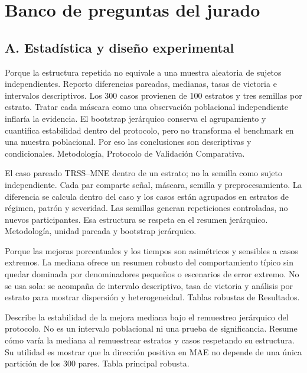 \section*{Banco de preguntas del jurado}

\subsection*{A. Estadística y diseño experimental}

{Porque la estructura repetida no equivale a una muestra aleatoria de sujetos independientes. Reporto diferencias pareadas, medianas, tasas de victoria e intervalos descriptivos.}
{Los 300 casos provienen de 100 estratos y tres semillas por estrato. Tratar cada máscara como una observación poblacional independiente inflaría la evidencia. El bootstrap jerárquico conserva el agrupamiento y cuantifica estabilidad dentro del protocolo, pero no transforma el benchmark en una muestra poblacional. Por eso las conclusiones son descriptivas y condicionales.}
{Metodología, Protocolo de Validación Comparativa.}

{El caso pareado TRSS--MNE dentro de un estrato; no la semilla como sujeto independiente.}
{Cada par comparte señal, máscara, semilla y preprocesamiento. La diferencia se calcula dentro del caso y los casos están agrupados en estratos de régimen, patrón y severidad. Las semillas generan repeticiones controladas, no nuevos participantes. Esa estructura se respeta en el resumen jerárquico.}
{Metodología, unidad pareada y bootstrap jerárquico.}

{Porque las mejoras porcentuales y los tiempos son asimétricos y sensibles a casos extremos.}
{La mediana ofrece un resumen robusto del comportamiento típico sin quedar dominada por denominadores pequeños o escenarios de error extremo. No se usa sola: se acompaña de intervalo descriptivo, tasa de victoria y análisis por estrato para mostrar dispersión y heterogeneidad.}
{Tablas robustas de Resultados.}

{Describe la estabilidad de la mejora mediana bajo el remuestreo jerárquico del protocolo.}
{No es un intervalo poblacional ni una prueba de significancia. Resume cómo varía la mediana al remuestrear estratos y casos respetando su estructura. Su utilidad es mostrar que la dirección positiva en MAE no depende de una única partición de los 300 pares.}
{Tabla principal robusta.}

